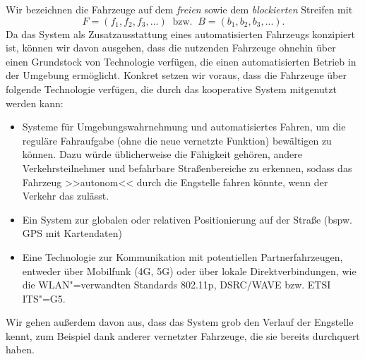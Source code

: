 Wir bezeichnen die Fahrzeuge auf dem \emph{freien} sowie dem \emph{blockierten} Streifen mit
\begin{equation}
F = (f_1, f_2, f_3, ...)\;\;\text{bzw.}\;\; B = (b_1, b_2, b_3, ...).
\end{equation}
Da das System als Zusatzausstattung eines automatisierten Fahrzeugs konzipiert ist, können wir davon ausgehen, dass die nutzenden Fahrzeuge ohnehin über einen Grundstock von Technologie verfügen, die einen automatisierten Betrieb in der Umgebung ermöglicht. Konkret setzen wir voraus, dass die Fahrzeuge über folgende Technologie verfügen, die durch das kooperative System mitgenutzt werden kann:
\begin{itemize}
	\item Systeme für Umgebungswahrnehmung und automatisiertes Fahren, um die reguläre Fahraufgabe (ohne die neue vernetzte Funktion) bewältigen zu können. Dazu würde üblicherweise die Fähigkeit gehören, andere Verkehrsteilnehmer und befahrbare Straßenbereiche zu erkennen, sodass das Fahrzeug >>autonom<< durch die Engstelle fahren könnte, wenn der Verkehr das zulässt.
	
	\item Ein System zur globalen oder relativen Positionierung auf der Straße (bspw. GPS mit Kartendaten)
	\item Eine Technologie zur Kommunikation mit potentiellen Partnerfahrzeugen, entweder über Mobilfunk (4G, 5G) oder über lokale Direktverbindungen, wie die WLAN"=verwandten Standards 802.11p, DSRC/WAVE bzw. ETSI ITS"=G5.
\end{itemize}
Wir gehen außerdem davon aus, dass das System grob den Verlauf der Engstelle kennt, zum Beispiel dank anderer vernetzter Fahrzeuge, die sie bereits durchquert haben.



